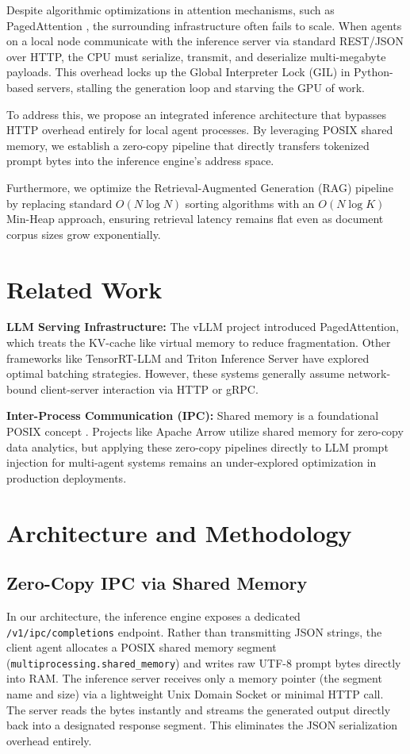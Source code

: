 \documentclass[conference]{IEEEtran}
\begin{document}
Despite algorithmic optimizations in attention mechanisms, such as PagedAttention \cite{kwon2023efficient}, the surrounding infrastructure often fails to scale. When agents on a local node communicate with the inference server via standard REST/JSON over HTTP, the CPU must serialize, transmit, and deserialize multi-megabyte payloads. This overhead locks up the Global Interpreter Lock (GIL) in Python-based servers, stalling the generation loop and starving the GPU of work.

To address this, we propose an integrated inference architecture that bypasses HTTP overhead entirely for local agent processes. By leveraging POSIX shared memory, we establish a zero-copy pipeline that directly transfers tokenized prompt bytes into the inference engine's address space. 

Furthermore, we optimize the Retrieval-Augmented Generation (RAG) pipeline by replacing standard $O(N \log N)$ sorting algorithms with an $O(N \log K)$ Min-Heap approach, ensuring retrieval latency remains flat even as document corpus sizes grow exponentially.

\section{Related Work}
\textbf{LLM Serving Infrastructure:} The vLLM project \cite{kwon2023efficient} introduced PagedAttention, which treats the KV-cache like virtual memory to reduce fragmentation. Other frameworks like TensorRT-LLM and Triton Inference Server have explored optimal batching strategies. However, these systems generally assume network-bound client-server interaction via HTTP or gRPC.

\textbf{Inter-Process Communication (IPC):} Shared memory is a foundational POSIX concept \cite{stevens1999unix}. Projects like Apache Arrow utilize shared memory for zero-copy data analytics, but applying these zero-copy pipelines directly to LLM prompt injection for multi-agent systems remains an under-explored optimization in production deployments.

\section{Architecture and Methodology}

\subsection{Zero-Copy IPC via Shared Memory}
In our architecture, the inference engine exposes a dedicated \texttt{/v1/ipc/completions} endpoint. Rather than transmitting JSON strings, the client agent allocates a POSIX shared memory segment (\texttt{multiprocessing.shared\_memory}) and writes raw UTF-8 prompt bytes directly into RAM. The inference server receives only a memory pointer (the segment name and size) via a lightweight Unix Domain Socket or minimal HTTP call. The server reads the bytes instantly and streams the generated output directly back into a designated response segment. This eliminates the JSON serialization overhead entirely.
\end{document}
